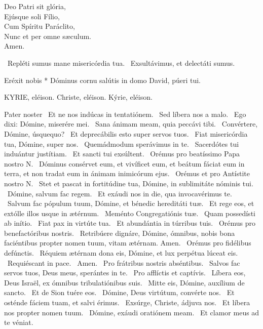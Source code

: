 Deo Patri sit glória,\\
Ejúsque soli Fílio,\\
Cum Spíritu Paráclito,\\
Nunc et per omne sæculum.\\
Amen.

\V\ Repléti sumus mane misericórdia tua. \R\ Exsultávimus, et delectáti sumus.

 Eréxit nobis * Dóminus cornu salútis in domo David, púeri tui.



KYRIE, eléison. Christe, eléison. Kýrie, eléison.

Pater noster  \V\ Et ne nos indúcas in tentatiónem. \R\ Sed líbera nos a malo. \V\ Ego dixi: Dómine, miserére mei. \R\ Sana ánimam meam, quia peccávi tibi. \V\ Convértere, Dómine, úsquequo? \R\ Et deprecábilis esto super servos tuos. \V\ Fiat misericórdia tua, Dómine, super nos. \R\ Quemádmodum sperávimus in te. \V\ Sacerdótes tui induántur justítiam. \R\ Et sancti tui exsúltent. \V\ Orémus pro beatíssimo Papa nostro N. \R\ Dóminus consérvet eum, et vivíficet eum, et beátum fáciat eum in terra, et non tradat eum in ánimam inimicórum ejus. \V\ Orémus et pro Antístite nostro N. \R\ Stet et pascat in fortitúdine tua, Dómine, in sublimitáte nóminis tui. \V\ Dómine, salvum fac regem. \R\ Et exáudi nos in die, qua invocavérimus te. \V\ Salvum fac pópulum tuum, Dómine, et bénedic hereditáti tuæ. \R\ Et rege eos, et extólle illos usque in ætérnum. \V\ Meménto Congregatiónis tuæ. \R\ Quam possedísti ab inítio. \V\ Fiat pax in virtúte tua. \R\ Et abundántia in túrribus tuis. \V\ Orémus pro benefactóribus nostris. \R\ Retribúere dignáre, Dómine, ómnibus, nobis bona faciéntibus propter nomen tuum, vitam ætérnam. Amen. \V\ Orémus pro fidélibus defúnctis. \R\ Réquiem ætérnam dona eis, Dómine, et lux perpétua lúceat eis. \V\ Requiéscant in pace. \R\ Amen. \V\ Pro frátribus nostris abséntibus. \R\ Salvos fac servos tuos, Deus meus, sperántes in te. \V\ Pro afflíctis et captívis. \R\ Líbera eos, Deus Israël, ex ómnibus tribulatiónibus suis. \V\ Mitte eis, Dómine, auxílium de sancto. \R\ Et de Sion tuére eos. \V\ Dómine, Deus virtútum, convérte nos. \R\ Et osténde fáciem tuam, et salvi érimus. \V\ Exsúrge, Christe, ádjuva nos. \R\ Et líbera nos propter nomen tuum. \V\ Dómine, exáudi oratiónem meam. \R\ Et clamor meus ad te véniat.

